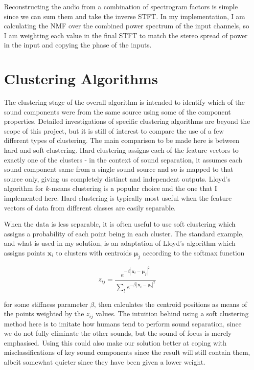 \documentclass[10pt,twoside,a4paper]{report}
\begin{document}
Reconstructing the audio from a combination of spectrogram factors is simple since we can sum them and take the inverse STFT. In my implementation, I am calculating the NMF over the combined power spectrum of the input channels, so I am weighting each value in the final STFT to match the stereo spread of power in the input and copying the phase of the inputs.

\section{Clustering Algorithms}

The clustering stage of the overall algorithm is intended to identify which of the sound components were from the same source using some of the component properties. Detailed investigations of specific clustering algorithms are beyond the scope of this project, but it is still of interest to compare the use of a few different types of clustering. The main comparison to be made here is between hard and soft clustering. Hard clustering assigns each of the feature vectors to exactly one of the clusters - in the context of sound separation, it assumes each sound component same from a single sound source and so is mapped to that source only, giving us completely distinct and independent outputs. Lloyd's algorithm for $ k $-means clustering is a popular choice and the one that I implemented here. Hard clustering is typically most useful when the feature vectors of data from different classes are easily separable.

When the data is less separable, it is often useful to use soft clustering which assigns a probability of each point being in each cluster. The standard example, and what is used in my solution, is an adaptation of Lloyd's algorithm which assigns points $ \mathbf{x}_i $ to clusters with centroids $ \mathbf{\mu}_j $ according to the softmax function

\begin{equation}
z_{ij} = \frac{e^{-\beta \left| \mathbf{x}_i - \mathbf{\mu}_j \right|^2}}{\sum_l e^{-\beta \left| \mathbf{x}_i - \mathbf{\mu}_l \right|^2}}
\end{equation}

for some stiffness parameter $ \beta $, then calculates the centroid positions as means of the points weighted by the $ z_{ij} $ values. The intuition behind using a soft clustering method here is to imitate how humans tend to perform sound separation, since we do not fully eliminate the other sounds, but the sound of focus is merely emphasised. Using this could also make our solution better at coping with misclassifications of key sound components since the result will still contain them, albeit somewhat quieter since they have been given a lower weight.
\end{document}

